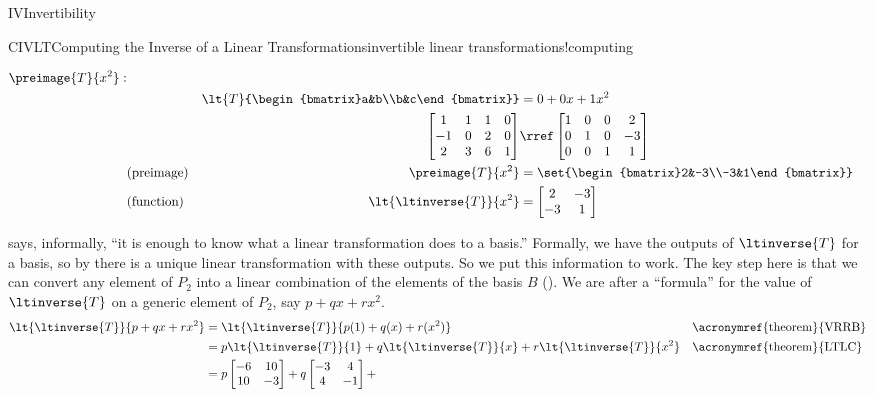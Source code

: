 \begin{subsect}{IV}{Invertibility}
\begin{example}{CIVLT}{Computing the Inverse of a Linear Transformations}{invertible linear transformations!computing}
\begin{para}
\begin{align*}
%
%
\preimage{T}{x^2}:&\\
&&\lt{T}{\begin{bmatrix}a&b\\b&c\end{bmatrix}}
&=0+0x+1x^2\\
%
&&\begin{bmatrix}
 1 & 1 & 1 & 0\\
 -1 & 0 & 2 & 0\\
 2 & 3 & 6 & 1
\end{bmatrix}
&\rref
\begin{bmatrix}
1 & 0 & 0& 2 \\
0 & 1 & 0& -3 \\
0 & 0 & 1&  1
\end{bmatrix}
\\
&\text{(preimage)}&\preimage{T}{x^2}
&=\set{\begin{bmatrix}2&-3\\-3&1\end{bmatrix}}\\
%
&\text{(function)}&\lt{\ltinverse{T}}{x^2}
&=
\begin{bmatrix}2&-3\\-3&1\end{bmatrix}
\end{align*}
\end{para}
%
\begin{para} says, informally, ``it is enough to know what a linear transformation does to a basis.''  Formally, we have the outputs of $\ltinverse{T}$ for a basis, so by  there is a unique linear transformation with these outputs.  So we put this information to work.  The key step here is that we can convert any element of $P_2$ into a linear combination of the elements of the basis $B$ ().  We are after a ``formula'' for the value of $\ltinverse{T}$ on a generic element of $P_2$, say $p+qx+rx^2$.
%
\begin{align*}
\lt{\ltinverse{T}}{p+qx+rx^2}
&=
\lt{\ltinverse{T}}{p(1)+q(x)+r(x^2)}
&&\text{\acronymref{theorem}{VRRB}}\\
&=
p\lt{\ltinverse{T}}{1}+
q\lt{\ltinverse{T}}{x}+
r\lt{\ltinverse{T}}{x^2}
&&\text{\acronymref{theorem}{LTLC}}\\
&=
p\begin{bmatrix}-6&10\\10&-3\end{bmatrix}+
q\begin{bmatrix}-3&4\\4&-1\end{bmatrix}+

\end{align*}
\end{para}
\end{example}
\end{subsect}
